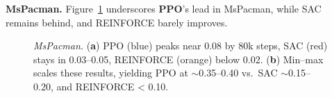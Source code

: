 \noindent \textbf{MsPacman.} Figure~\ref{fig:mspacman_combined} underscores \textbf{PPO}'s lead in MsPacman, while SAC remains behind, and REINFORCE barely improves.
\begin{figure} 
	\centering
	\quad
	\caption{\emph{MsPacman.}
		(\textbf{a}) PPO (blue) peaks near 0.08 by 80k steps, SAC (red) stays in 0.03--0.05, REINFORCE (orange) below 0.02.
		(\textbf{b}) Min--max scales these results, yielding PPO at $\sim$\num{0.35}--\num{0.40} vs.\ SAC $\sim$\num{0.15}--\num{0.20}, and REINFORCE < 0.10.}
	\label{fig:mspacman_combined}
\end{figure}



\medskip

